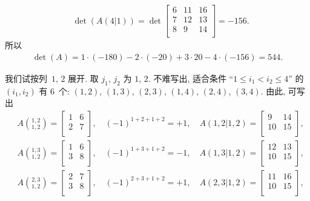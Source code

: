 \documentclass[%
    UTF8,%
    fontset=none,%
    punct=kaiming,%
    zihao=-4,%
    a4paper,%
    oneside,%
]{ctexbook}
\renewcommand*{\leq}{\leqslant}
\begin{document}
\begin{example}
\begin{align*}
         & \det {(A(4|1))}
        = \det {\begin{bmatrix}
                        6 & 11 & 16 \\
                        7 & 12 & 13 \\
                        8 & 9  & 14 \\
                    \end{bmatrix}}
        = -156.
    \end{align*}
    所以
    \begin{align*}
        \det {(A)}
        = 1 \cdot (-180) - 2 \cdot (-20)
        + 3 \cdot 20 - 4 \cdot (-156)
        = 544.
    \end{align*}

    我们试按列~\(1\), \(2\) 展开.
    取 \(j_1\), \(j_2\) 为 \(1\), \(2\).
    不难写出, 适合条件
    ``\(1 \leq i_1 < i_2 \leq 4\)''
    的 \((i_1, i_2)\) 有 \(6\)~个:
    \((1, 2)\),
    \((1, 3)\), \((2, 3)\),
    \((1, 4)\), \((2, 4)\), \((3, 4)\).
    由此, 可写出
    \begin{align*}
         & A\binom{1,2}{1,2}
        = \begin{bmatrix}1&6\\2&7\\ \end{bmatrix},
        \quad
        (-1)^{1+2+1+2} = +1,
        \quad
        A(1,2|1,2)
        = \begin{bmatrix}9&14\\10&15\\ \end{bmatrix},  \\
         & A\binom{1,3}{1,2}
        = \begin{bmatrix}1&6\\3&8\\ \end{bmatrix},
        \quad
        (-1)^{1+3+1+2} = -1,
        \quad
        A(1,3|1,2)
        = \begin{bmatrix}12&13\\10&15\\ \end{bmatrix}, \\
         & A\binom{2,3}{1,2}
        = \begin{bmatrix}2&7\\3&8\\ \end{bmatrix},
        \quad
        (-1)^{2+3+1+2} = +1,
        \quad
        A(2,3|1,2)
        = \begin{bmatrix}11&16\\10&15\\ \end{bmatrix}, \\

\end{align*}
\end{example}
\end{document}
